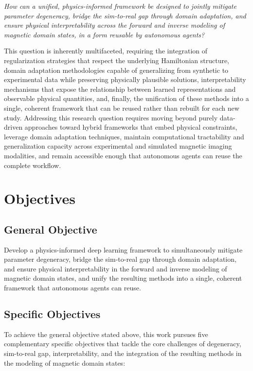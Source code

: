 \documentclass[letterpaper, 12, one column]{article}
\begin{document}
\begin{center}
\textit{How can a unified, physics-informed framework be designed to jointly mitigate parameter degeneracy, bridge the sim-to-real gap through domain adaptation, and ensure physical interpretability across the forward and inverse modeling of magnetic domain states, in a form reusable by autonomous agents?}
\end{center}

This question is inherently multifaceted, requiring the integration of regularization strategies that respect the underlying Hamiltonian structure, domain adaptation methodologies capable of generalizing from synthetic to experimental data while preserving physically plausible solutions, interpretability mechanisms that expose the relationship between learned representations and observable physical quantities, and, finally, the unification of these methods into a single, coherent framework that can be reused rather than rebuilt for each new study. Addressing this research question requires moving beyond purely data-driven approaches toward hybrid frameworks that embed physical constraints, leverage domain adaptation techniques, maintain computational tractability and generalization capacity across experimental and simulated magnetic imaging modalities, and remain accessible enough that autonomous agents can reuse the complete workflow.


\section{Objectives}

\subsection{General Objective}

Develop a physics-informed deep learning framework to simultaneously mitigate parameter degeneracy, bridge the sim-to-real gap through domain adaptation, and ensure physical interpretability in the forward and inverse modeling of magnetic domain states, and unify the resulting methods into a single, coherent framework that autonomous agents can reuse.

\subsection{Specific Objectives}\label{sec:specific_objectives}

To achieve the general objective stated above, this work pursues five complementary specific objectives that tackle the core challenges of degeneracy, sim-to-real gap, interpretability, and the integration of the resulting methods in the modeling of magnetic domain states:
\end{document}
